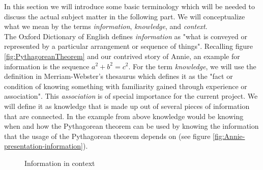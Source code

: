 \documentclass[twoside, 12pt]{article}
\begin{document}
In this section we will introduce some basic terminology which will be needed to discuss the actual subject matter in the following part. We will conceptualize what we mean by the terms \textit{information}, \textit{knowledge}, and \textit{context}.\\

The Oxford Dictionary of English \cite{OED:npentrel14} defines \textit{information} as "what is conveyed or represented by a particular arrangement or sequence of things". Recalling figure \ref{fig:PythagoreanTheorem} and our contrived story of Annie, an example for information is the sequence \textit{$a^2 + b^2 = c^2$}. For the term \textit{knowledge}, we will use the definition in Merriam-Webster's thesaurus \cite{Webster:npentrel14} which defines it as the "fact or condition of knowing something with familiarity gained through experience or association". This \textit{association} is of special importance for the current project. We will define it as knowledge that is made up out of several pieces of information that are connected. In the example from above knowledge would be knowing when and how the Pythagorean theorem can be used by knowing the information that the usage of the Pythagorean theorem depends on (see figure \ref{fig:Annie-presentation-information}).\\ 

\begin{figure}
\vspace{-26pt}
  \begin{center}
  \end{center}
\vspace{-20pt}
  \caption{Information in context}
  \label{fig:Annie-context}
\vspace{-10pt}
\end{figure}
\end{document}
